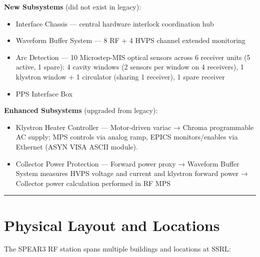 {\textbf{New Subsystems} (did not exist in legacy):

\begin{itemize}
\tightlist
\item
  Interface Chassis --- central hardware interlock coordination hub
\item
  Waveform Buffer System --- 8 RF + 4 HVPS channel extended monitoring
\item
  Arc Detection --- 10 Microstep-MIS optical sensors across 6 receiver units (5 active, 1 spare): 4 cavity windows (2 sensors per window on 4 receivers), 1 klystron window + 1 circulator (sharing 1 receiver), 1 spare receiver
\item
  PPS Interface Box
\end{itemize}

\textbf{Enhanced Subsystems} (upgraded from legacy):

\begin{itemize}
\tightlist
\item
  Klystron Heater Controller --- Motor-driven variac → Chroma programmable AC supply; MPS controls via analog ramp, EPICS monitors/enables via Ethernet (ASYN VISA ASCII module).
\item
  Collector Power Protection --- Forward power proxy → Waveform Buffer System measures HVPS voltage and current and klystron forward power → Collector power calculation performed in RF MPS
\end{itemize}

\begin{center}\rule{0.5\linewidth}{0.5pt}\end{center}

\section{Physical Layout and Locations}\label{physical-layout-and-locations}

The SPEAR3 RF station spans multiple buildings and locations at SSRL:

}
